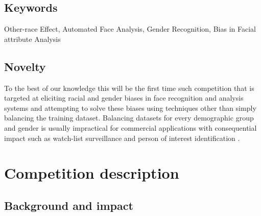 \documentclass[11pt, oneside]{article}
\makeatletter
\let\@internalcite\cite
\def\cite{\def\citeauthoryear##1##2{##1, ##2}\@internalcite}
\makeatother
\begin{document}
\subsection{Keywords}
Other-race Effect, Automated Face Analysis, Gender Recognition, Bias in Facial
attribute Analysis

\subsection{Novelty}
To the best of our knowledge this will be the first time such competition that 
is targeted at eliciting racial and gender biases in face recognition and 
analysis systems and attempting to solve these biases using techniques other 
than simply balancing the training dataset. Balancing datasets for every 
demographic group and gender is usually impractical for commercial applications 
with consequential impact such as watch-list surveillance 
\cite{kamgar2011toward} and person of interest identification 
\cite{best2014unconstrained}.

\section{Competition description}

\subsection{Background and impact}

\end{document}
